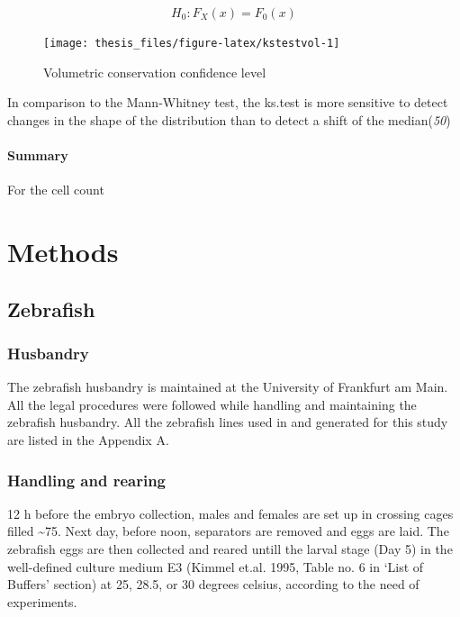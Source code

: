 \documentclass[11pt,singlespacinge,twoside]{reedthesis} %
\begin{document}
\[H_{0} : F_X(x)=F_0(x)\]


\begin{figure}

{\centering \texttt{[image: thesis\_files/figure-latex/kstestvol-1]} 

}

\caption{Volumetric conservation confidence level}\label{fig:kstestvol}
\end{figure}
\noindent In comparison to the Mann-Whitney test, the ks.test is more sensitive to detect changes in the shape of the distribution than to detect a shift of the median(\emph{50})

\hypertarget{summary-2}{%
\paragraph{Summary}\label{summary-2}}

For the cell count

\hypertarget{met}{%
\section{Methods}\label{met}}

\hypertarget{Zeb-met}{%
\subsection{Zebrafish}\label{Zeb-met}}

\hypertarget{husbandry}{%
\subsubsection{Husbandry}\label{husbandry}}

The zebrafish husbandry is maintained at the University of Frankfurt am Main. All the legal procedures were followed while handling and maintaining the zebrafish husbandry. All the zebrafish lines used in and generated for this study are listed in the Appendix A.

\hypertarget{handling-and-rearing}{%
\subsubsection{Handling and rearing}\label{handling-and-rearing}}

12 h before the embryo collection, males and females are set up in crossing cages filled \textasciitilde{}75. Next day, before noon, separators are removed and eggs are laid. The zebrafish eggs are then collected and reared untill the larval stage (Day 5) in the well-defined culture medium E3 (Kimmel et.al. 1995, Table no. 6 in `List of Buffers' section) at 25, 28.5, or 30 degrees celsius, according to the need of experiments.
\end{document}
